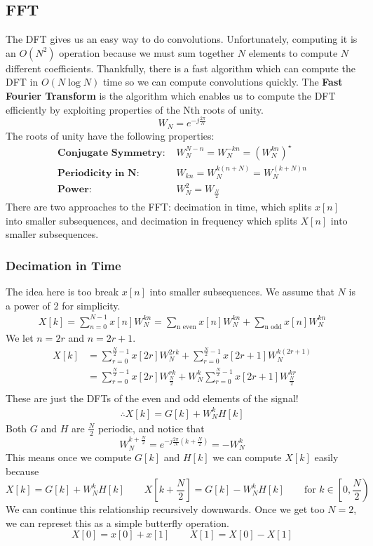 \documentclass{article}
\begin{document}
\subsection{FFT}
The DFT gives us an easy way to do convolutions. Unfortunately, computing it is an $O(N^2)$ operation
because we must sum together $N$ elements to compute $N$ different coefficients. Thankfully, there is a fast
algorithm which can compute the DFT in $O(N\log N)$ time so we can compute convolutions quickly. The \textbf{Fast Fourier Transform}
is the algorithm which enables us to compute the DFT efficiently by exploiting properties of the Nth roots of unity.
$$W_N=e^{-j\frac{2\pi}{N}}$$
The roots of unity have the following properties:
\begin{align*}
  \textbf{Conjugate Symmetry: }& W_N^{N-n} = W_N^{-kn} = (W_N^{kn})^\star\\
  \textbf{Periodicity in N: }& W_{kn} = W_N^{k(n+N)} = W_N^{(k+N)n}\\
  \textbf{Power: } & W_N^2 = W_\frac{N}{2}
\end{align*}
There are two approaches to the FFT: decimation in time, which splits $x[n]$ into smaller subsequences, and decimation in frequency
which splits $X[n]$ into smaller subsequences.
\subsubsection{Decimation in Time}
The idea here is too break $x[n]$ into smaller subsequences. We assume that $N$ is a power of 2 for simplicity.
\begin{align*}
  X[k]=\sum_{n=0}^{N-1}x[n]W_N^{kn} = \sum_{\text{n even}}x[n]W_N^{kn}+\sum_{\text{n odd}}x[n]W_N^{kn}
\end{align*}
We let $n=2r$ and $n=2r+1$.
\begin{align*}
  X[k] &= \sum_{r=0}^{\frac{N}{2}-1}x[2r]W_N^{2rk}+\sum_{r=0}^{\frac{N}{2}-1}x[2r+1]W_N^{k(2r+1)}\\
  &= \sum_{r=0}^{\frac{N}{2}-1}x[2r]W_{\frac{N}{2}}^{rk}+W_N^k\sum_{r=0}^{\frac{N}{2}-1}x[2r+1]W_{\frac{N}{2}}^{kr}\\
\end{align*}
These are just the DFTs of the even and odd elements of the signal!
\begin{align*}
  \therefore X[k] = G[k] + W_N^kH[k]
\end{align*}
Both $G$ and $H$ are $\frac{N}{2}$ periodic, and notice that
$$W_N^{k+\frac{N}{2}}=e^{-j\frac{2\pi}{N}(k+\frac{N}{2})}= -W_N^k$$
This means once we compute $G[k]$ and $H[k]$ we can compute $X[k]$ easily because
$$X[k] = G[k]+W_N^kH[k]\qquad X\left[k+\frac{N}{2}\right]=G[k]-W_N^kH[k] \qquad \text{for }k\in\left[0, \frac{N}{2}\right)$$
We can continue this relationship recursively downwards.
Once we get too $N=2$, we can represet this as a simple butterfly operation.
$$X[0] = x[0]+x[1] \qquad X[1] = X[0]-X[1]$$
\end{document}
